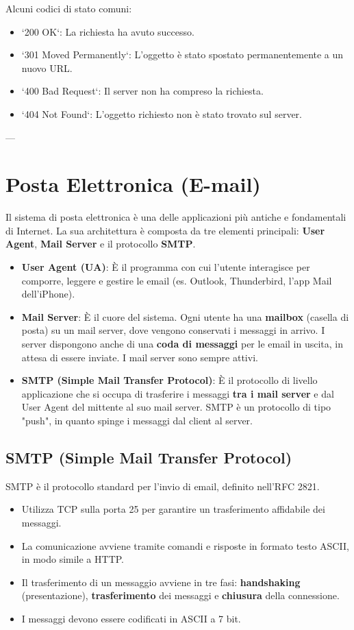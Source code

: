 Alcuni codici di stato comuni:
\begin{itemize}
    \item `200 OK`: La richiesta ha avuto successo.
    \item `301 Moved Permanently`: L'oggetto è stato spostato permanentemente a un nuovo URL.
    \item `400 Bad Request`: Il server non ha compreso la richiesta.
    \item `404 Not Found`: L'oggetto richiesto non è stato trovato sul server.
\end{itemize}

---
\section{Posta Elettronica (E-mail)}
Il sistema di posta elettronica è una delle applicazioni più antiche e fondamentali di Internet. La sua architettura è composta da tre elementi principali: \textbf{User Agent}, \textbf{Mail Server} e il protocollo \textbf{SMTP}.
\begin{itemize}
    \item \textbf{User Agent (UA)}: È il programma con cui l'utente interagisce per comporre, leggere e gestire le email (es. Outlook, Thunderbird, l'app Mail dell'iPhone).
    \item \textbf{Mail Server}: È il cuore del sistema. Ogni utente ha una \textbf{mailbox} (casella di posta) su un mail server, dove vengono conservati i messaggi in arrivo. I server dispongono anche di una \textbf{coda di messaggi} per le email in uscita, in attesa di essere inviate. I mail server sono sempre attivi.
    \item \textbf{SMTP (Simple Mail Transfer Protocol)}: È il protocollo di livello applicazione che si occupa di trasferire i messaggi \textbf{tra i mail server} e dal User Agent del mittente al suo mail server. SMTP è un protocollo di tipo "push", in quanto spinge i messaggi dal client al server.
\end{itemize}

\subsection{SMTP (Simple Mail Transfer Protocol)}
SMTP è il protocollo standard per l'invio di email, definito nell'RFC 2821.
\begin{itemize}
    \item Utilizza TCP sulla porta 25 per garantire un trasferimento affidabile dei messaggi.
    \item La comunicazione avviene tramite comandi e risposte in formato testo ASCII, in modo simile a HTTP.
    \item Il trasferimento di un messaggio avviene in tre fasi: \textbf{handshaking} (presentazione), \textbf{trasferimento} dei messaggi e \textbf{chiusura} della connessione.
    \item I messaggi devono essere codificati in ASCII a 7 bit.
\end{itemize}


